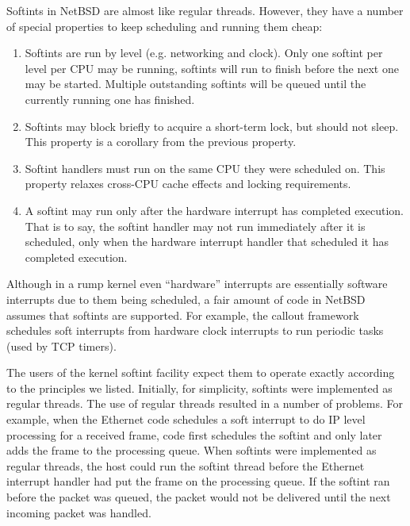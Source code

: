 Softints in NetBSD are almost like regular threads.  However, they
have a number of special properties to keep scheduling and running
them cheap:

\begin{enumerate}
\item   Softints are run by level (e.g. networking and clock).
	Only one softint per level per CPU may be running, \ie
	softints will run to finish before the next one may be
	started.  Multiple outstanding softints will be queued
	until the currently running one has finished.

\item   Softints may block briefly to acquire a short-term lock,
	but should not sleep.  This property is a corollary from the previous
	property.

\item   Softint handlers must run on the same CPU they were scheduled
	on.  This property relaxes cross-CPU cache effects and locking
	requirements.

\item   A softint may run only after the hardware interrupt has
	completed execution.  That is to say, the softint handler
	may not run immediately after it is scheduled, only when
	the hardware interrupt handler that scheduled it has
	completed execution.
\end{enumerate}

Although in a rump kernel even ``hardware'' interrupts are essentially
software interrupts due to them being scheduled, a fair amount of
code in NetBSD assumes that softints are supported.  For example,
the callout framework~\cite{costello:callout} schedules soft
interrupts from hardware clock interrupts to run periodic tasks
(used \eg by TCP timers).

The users of the kernel softint facility expect them to operate exactly
according to the principles we listed.  Initially, for simplicity,
softints were implemented as regular threads.  The use of regular threads
resulted in a number of problems.  For example, when the Ethernet code
schedules a soft interrupt to do IP level processing for a received frame,
code first schedules the softint and only later adds the frame to the
processing queue.  When softints were implemented as regular threads, the
host could run the softint thread before the Ethernet interrupt handler
had put the frame on the processing queue.  If the softint ran before the
packet was queued, the packet would not be delivered until the next
incoming packet was handled.


